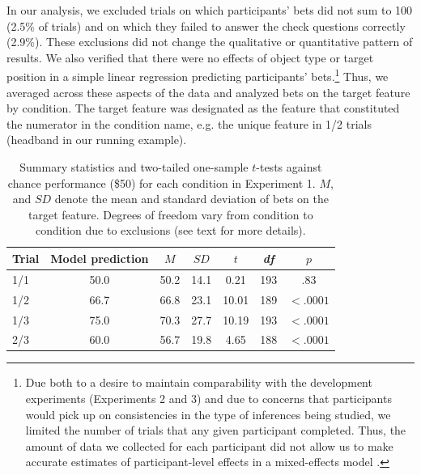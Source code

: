 \documentclass[review]{elsarticle}
\begin{document}
In our analysis, we excluded trials on which participants' bets did not sum to 100 (2.5\% of trials) and on which they failed to answer the check questions correctly (2.9\%). These exclusions did not change the qualitative or quantitative pattern of results. We also verified that there were no effects of object type or target position in a simple linear regression predicting participants' bets.\footnote{Due both to a desire to maintain comparability with the development experiments (Experiments 2 and 3) and due to concerns that participants would pick up on consistencies in the type of inferences being studied, we limited the number of trials that any given participant completed. Thus, the amount of data we collected for each participant did not allow us to make accurate estimates of participant-level effects in a mixed-effects model \citep{gelman2006,jaeger2011}.}
Thus, we averaged across these aspects of the data and analyzed bets on the target feature by condition. The target feature was designated as the feature that constituted the numerator in the condition name, e.g. the unique feature in 1/2 trials ({\sc headband} in our running example).

\begin{table}
  \begin{center}
    \begin{tabular}{lcccccc}
      \hline
       Trial & Model prediction & $M$ & $SD$ & $t$ & {\it df} & $p$ \\
      \hline
      1/1 & 50.0 & 50.2 & 14.1 & 0.21 & 193 & .83 \\
      1/2 & 66.7 & 66.8 & 23.1 & 10.01 & 189 & $< .0001$ \\
      1/3 & 75.0 & 70.3 & 27.7 & 10.19 & 193 & $< .0001$ \\
      2/3 & 60.0 & 56.7 & 19.8 & 4.65 & 188 & $< .0001$ \\
      \hline
    \end{tabular}
    \caption{\label{tab:adults} Summary statistics and two-tailed one-sample $t$-tests against chance performance (\$50) for each condition in Experiment 1. $M$, and $SD$ denote the mean and standard deviation of bets on the target feature. Degrees of freedom vary from condition to condition due to exclusions (see text for more details).}
  \end{center}
\end{table}
\end{document}
